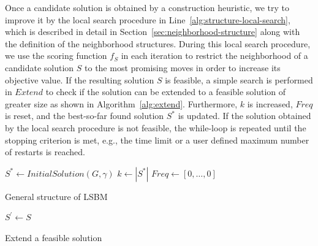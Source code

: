 \documentclass[draft,final]{vutinfth} %
\begin{document}
Once a candidate solution is obtained by a construction heuristic, we try to improve it by the local search procedure in Line~\ref{alg:structure-local-search}, which is described in detail in Section~\ref{sec:neighborhood-structure} along with the definition of the neighborhood structures. During this local search procedure, we use the scoring function $f_S$ in each iteration to restrict the neighborhood of a candidate solution $S$ to the most promising moves in order to increase its objective value. 
If the resulting solution $S$ is feasible, a simple search is performed in $\mathit{Extend}$ to check if the solution can be extended to a feasible solution of greater size as shown in Algorithm~\ref{alg:extend}. 
Furthermore, $k$ is increased, $\mathit{Freq}$ is reset, and the best-so-far found solution $S^*$ is updated. 
If the solution obtained by the local search procedure is not feasible, the while-loop is repeated until the stopping criterion is met, e.g., the time limit or a user defined maximum number of restarts is reached. 

\begin{algorithm}
    \DontPrintSemicolon
    $S^* \gets \mathit{InitialSolution}(G, \gamma)$ \;
    $k \gets |S^*|$ \; \label{alg:structure-lower-bound}
    $\mathit{Freq} \gets [0, \dots, 0]$ \label{alg:structure-freq}  

    \caption{General structure of LSBM}
    \label{alg:structure}
\end{algorithm}

\begin{algorithm}
    \DontPrintSemicolon
    $S^\prime \gets S$ \;
    \caption{Extend a feasible solution}
    \label{alg:extend}
\end{algorithm}
\end{document}
